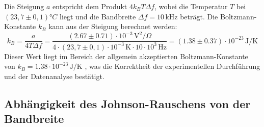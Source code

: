 Die Steigung $a$ entspricht dem Produkt $4 k_B T \Delta f$, wobei die Temperatur $T$ bei $(23,7 \pm 0,1) °C$ liegt und die Bandbreite $\Delta f = 10\,\mathrm{kHz}$ beträgt. Die Boltzmann-Konstante $k_B$ kann aus der Steigung berechnet werden:
\begin{equation}
k_B = \frac{a}{4 T \Delta f} = \frac{(2.67 \pm 0.71) \cdot 10^{-3} \,\mathrm{V}^2/\Omega}{4 \cdot (23,7 \pm 0,1) \cdot 10^{-3} \,\mathrm{K} \cdot 10 \cdot 10^3 \,\mathrm{Hz}} = (1.38 \pm 0.37) \cdot 10^{-23} \,\mathrm{J/K}
\end{equation}
Dieser Wert liegt im Bereich der allgemein akzeptierten Boltzmann-Konstante von $k_B = 1.38 \cdot 10^{-23} \,\mathrm{J/K}$ \cite{} %
, was die Korrektheit der experimentellen Durchführung und der Datenanalyse bestätigt.
\subsection{Abhängigkeit des Johnson-Rauschens von der Bandbreite}


